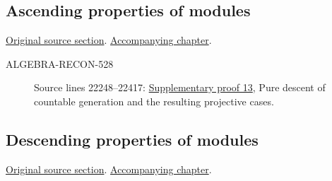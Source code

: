 \subsection{Ascending properties of modules}
\hypertarget{algebra-source-section-ascent}{}
\noindent\href{https://github.com/stacks/stacks-project/blob/a04446e57ec1fbc252a871afcec7752fb2807b14/algebra.tex\#L22303}{Original source section}. \href{algebra.pdf\#nameddest=section-ascent}{Accompanying chapter}.

\begin{description}
\item[ALGEBRA-RECON-528] Source lines 22248--22417: \hyperlink{algebra_ml_coherent_notes_20260927}{Supplementary proof 13}, Pure descent of countable generation and the resulting projective cases.
\end{description}

\subsection{Descending properties of modules}
\hypertarget{algebra-source-section-descent}{}
\noindent\href{https://github.com/stacks/stacks-project/blob/a04446e57ec1fbc252a871afcec7752fb2807b14/algebra.tex\#L22332}{Original source section}. \href{algebra.pdf\#nameddest=section-descent}{Accompanying chapter}.

